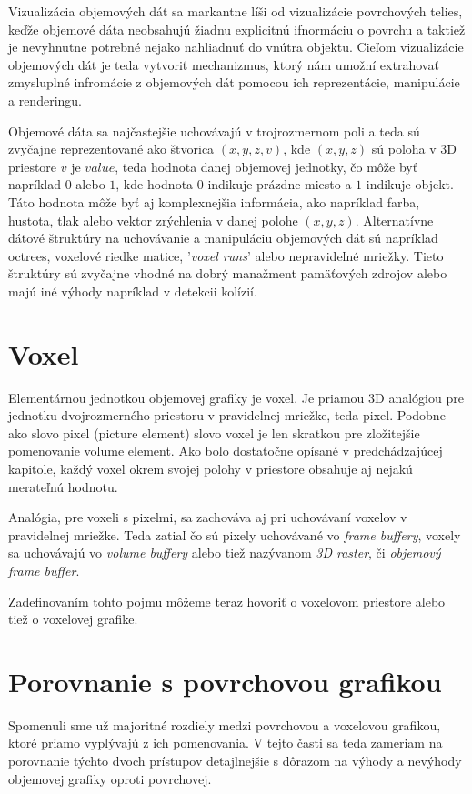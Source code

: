 Vizualizácia objemových dát sa markantne líši od vizualizácie povrchových telies, keďže objemové dáta neobsahujú žiadnu explicitnú ifnormáciu o povrchu a taktiež je nevyhnutne potrebné nejako nahliadnuť do vnútra objektu. Cieľom vizualizácie objemových dát je teda vytvoriť mechanizmus, ktorý nám umožní extrahovať zmysluplné infromácie z objemových dát pomocou ich reprezentácie, manipulácie a renderingu.

Objemové dáta sa najčastejšie uchovávajú v trojrozmernom poli a teda sú zvyčajne reprezentované ako štvorica $(x,y,z,v)$, kde $(x,y,z)$ sú poloha v 3D priestore $v$ je $value$, teda hodnota danej objemovej jednotky, čo môže byť napríklad $0$ alebo $1$, kde hodnota $0$ indikuje prázdne miesto a $1$ indikuje objekt. Táto hodnota môže byť aj komplexnejšia informácia, ako napríklad farba, hustota, tlak alebo vektor zrýchlenia v danej polohe $(x,y,z)$.
\cite{VolumeGraphics} Alternatívne dátové štruktúry na uchovávanie a manipuláciu objemových dát sú napríklad octrees, voxelové riedke matice, '\textit{voxel runs}' alebo nepravideľné mriežky. Tieto štruktúry sú zvyčajne vhodné na dobrý manažment pamäťových zdrojov alebo majú iné výhody napríklad v detekcii kolízií.
\section{Voxel}
Elementárnou jednotkou objemovej grafiky je voxel. Je priamou 3D analógiou pre jednotku dvojrozmerného priestoru v pravidelnej mriežke, teda pixel. Podobne ako slovo pixel (picture element) slovo voxel je len skratkou pre zložitejšie pomenovanie volume element. Ako bolo dostatočne opísané v predchádzajúcej kapitole, každý voxel okrem svojej polohy v priestore obsahuje aj nejakú merateľnú hodnotu. 

Analógia, pre voxeli s pixelmi, sa zachováva aj pri uchovávaní voxelov v pravidelnej mriežke. Teda zatiaľ čo sú pixely uchovávané vo \textit{frame buffery}, voxely sa uchovávajú vo \textit{volume buffery} alebo tiež nazývanom \textit{3D raster}, či \textit{objemový frame buffer}.

Zadefinovaním tohto pojmu môžeme teraz hovoriť o voxelovom priestore alebo tiež o voxelovej grafike.

\section{Porovnanie s povrchovou grafikou}
Spomenuli sme už majoritné rozdiely medzi povrchovou a voxelovou grafikou, ktoré priamo vyplývajú z ich pomenovania. V tejto časti sa teda zameriam na porovnanie týchto dvoch prístupov detajlnejšie s dôrazom na výhody a nevýhody objemovej grafiky oproti povrchovej.

